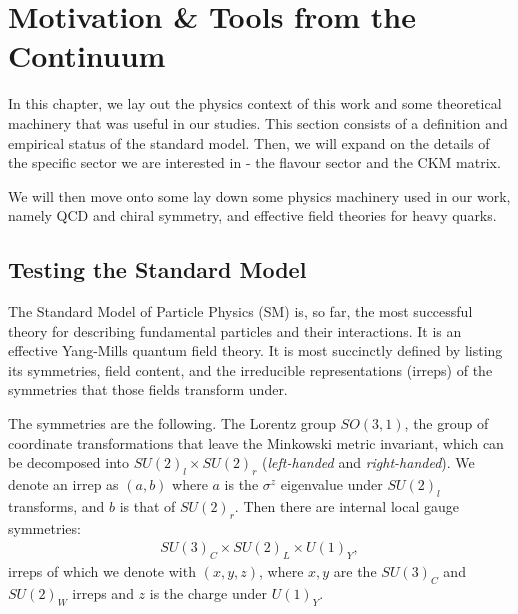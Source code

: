 \chapter{Motivation \& Tools from the Continuum}
\label{chap:background}

In this chapter, we lay out the physics context of this work and some theoretical machinery that was useful in our studies. This section consists of a definition and empirical status of the standard model. Then, we will expand on the details of the specific sector we are interested in - the flavour sector and the CKM matrix.

We will then move onto some lay down some physics machinery used in our work, namely QCD and chiral symmetry, and effective field theories for heavy quarks.

\section{Testing the Standard Model}

The Standard Model of Particle Physics (SM) is, so far, the most successful theory for describing fundamental particles and their interactions. It is an effective Yang-Mills quantum field theory. It is most succinctly defined by listing its symmetries, field content, and the irreducible representations (irreps) of the symmetries that those fields transform under.

The symmetries are the following. The Lorentz group $SO(3,1)$, the group of coordinate transformations that leave the Minkowski metric invariant, which can be decomposed into $SU(2)_l\times SU(2)_r$ ({\it{left-handed}} and {\it{right-handed}}). We denote an irrep as $(a,b)$ where $a$ is the $\sigma^z$ eigenvalue under $SU(2)_l$ transforms, and $b$ is that of $SU(2)_r$. Then there are internal local gauge symmetries:
\begin{align}
  SU(3)_C\times SU(2)_L \times U(1)_Y,
\end{align}
irreps of which we denote with $(x,y,z)$, where $x,y$ are the $SU(3)_C$ and $SU(2)_W$ irreps and $z$ is the charge under $U(1)_Y$.

